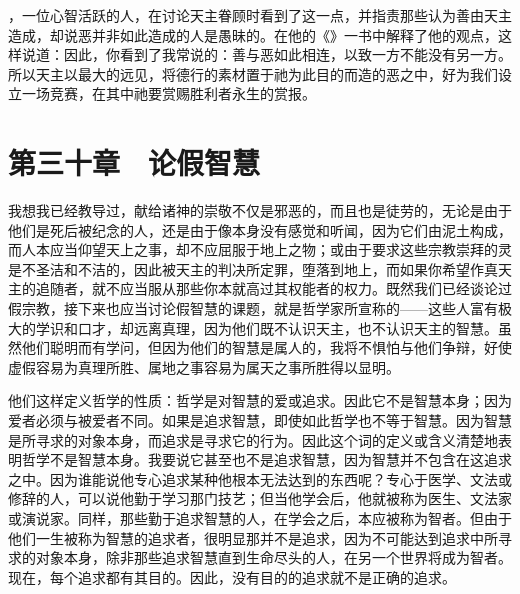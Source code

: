 ，一位心智活跃的人，在讨论天主眷顾时看到了这一点，并指责那些认为善由天主造成，却说恶并非如此造成的人是愚昧的。在他的《》一书中解释了他的观点，这样说道：因此，你看到了我常说的：善与恶如此相连，以致一方不能没有另一方。所以天主以最大的远见，将德行的素材置于祂为此目的而造的恶之中，好为我们设立一场竞赛，在其中祂要赏赐胜利者永生的赏报。\par


\section{第三十章　论假智慧}

我想我已经教导过，献给诸神的崇敬不仅是邪恶的，而且也是徒劳的，无论是由于他们是死后被纪念的人，还是由于像本身没有感觉和听闻，因为它们由泥土构成，而人本应当仰望天上之事，却不应屈服于地上之物；或由于要求这些宗教崇拜的灵是不圣洁和不洁的，因此被天主的判决所定罪，堕落到地上，而如果你希望作真天主的追随者，就不应当服从那些你本就高过其权能者的权力。既然我们已经谈论过假宗教，接下来也应当讨论假智慧的课题，就是哲学家所宣称的——这些人富有极大的学识和口才，却远离真理，因为他们既不认识天主，也不认识天主的智慧。虽然他们聪明而有学问，但因为他们的智慧是属人的，我将不惧怕与他们争辩，好使虚假容易为真理所胜、属地之事容易为属天之事所胜得以显明。\par

他们这样定义哲学的性质：哲学是对智慧的爱或追求。因此它不是智慧本身；因为爱者必须与被爱者不同。如果是追求智慧，即使如此哲学也不等于智慧。因为智慧是所寻求的对象本身，而追求是寻求它的行为。因此这个词的定义或含义清楚地表明哲学不是智慧本身。我要说它甚至也不是追求智慧，因为智慧并不包含在这追求之中。因为谁能说他专心追求某种他根本无法达到的东西呢？专心于医学、文法或修辞的人，可以说他勤于学习那门技艺；但当他学会后，他就被称为医生、文法家或演说家。同样，那些勤于追求智慧的人，在学会之后，本应被称为智者。但由于他们一生被称为智慧的追求者，很明显那并不是追求，因为不可能达到追求中所寻求的对象本身，除非那些追求智慧直到生命尽头的人，在另一个世界将成为智者。现在，每个追求都有其目的。因此，没有目的的追求就不是正确的追求。\par

